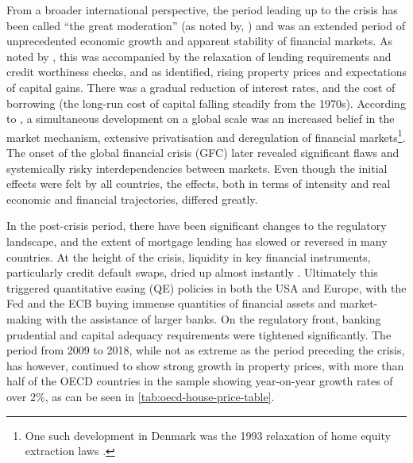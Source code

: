 \documentclass[
]{book}
\begin{document}
From a broader international perspective, the period leading up to the crisis has been called ``the great moderation'' (as noted by, \citet[pp.~28]{Buttiglione2014}) and was an extended period of unprecedented economic growth and apparent stability of financial markets. As noted by \citet{englund1999}, this was accompanied by the relaxation of lending requirements and credit worthiness checks, and as \citet{scanlon2008} identified, rising property prices and expectations of capital gains. There was a gradual reduction of interest rates, and the cost of borrowing (the long-run cost of capital falling steadily from the 1970s). According to \citet{scanlon2008}, a simultaneous development on a global scale was an increased belief in the market mechanism, extensive privatisation and deregulation of financial markets\footnote{One such development in Denmark was the 1993 relaxation of home equity extraction laws \citep{Andersen2019}.}. The onset of the global financial crisis (GFC) later revealed significant flaws and systemically risky interdependencies between markets. Even though the initial effects were felt by all countries, the effects, both in terms of intensity and real economic and financial trajectories, differed greatly. \citep{lunde2014introduction}

In the post-crisis period, there have been significant changes to the regulatory landscape, and the extent of mortgage lending has slowed or reversed in many countries. At the height of the crisis, liquidity in key financial instruments, particularly credit default swaps, dried up almost instantly \citep{danmarksnationalbank2008}. Ultimately this triggered quantitative easing (QE) policies in both the USA and Europe, with the Fed and the ECB buying immense quantities of financial assets and market-making with the assistance of larger banks. On the regulatory front, banking prudential and capital adequacy requirements were tightened significantly. The period from 2009 to 2018, while not as extreme as the period preceding the crisis, has however, continued to show strong growth in property prices, with more than half of the OECD countries in the sample showing year-on-year growth rates of over 2\%, as can be seen in \ref{tab:oecd-house-price-table}.
\end{document}
